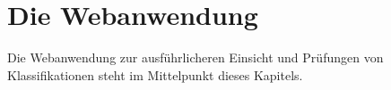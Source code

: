 \section{Die Webanwendung}
    Die Webanwendung zur ausführlicheren Einsicht
    und Prüfungen von Klassifikationen steht im Mittelpunkt dieses Kapitels.

    
    